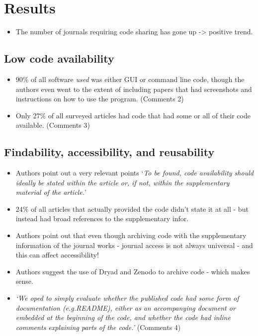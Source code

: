 \documentclass[
]{book}
\providecommand{\tightlist}{%
  \setlength{\itemsep}{0pt}\setlength{\parskip}{0pt}}
\begin{document}
\hypertarget{results-10}{%
\section{Results}\label{results-10}}

\begin{itemize}
\tightlist
\item
  The number of journals requiring code sharing has gone up -\textgreater{} positive trend.
\end{itemize}

\hypertarget{low-code-availability}{%
\subsection{Low code availability}\label{low-code-availability}}

\begin{itemize}
\tightlist
\item
  90\% of all software \emph{used} was either GUI or command line code, though the authors even went to the extent of including papers that had screenshots and instructions on how to use the program. (\protect\hypertarget{comments_culina}{}{Comments 2})
\item
  Only 27\% of all surveyed articles had code that had some or all of their code available. (\protect\hypertarget{comments_culina}{}{Comments 3})
\end{itemize}

\hypertarget{findability-accessibility-and-reusability}{%
\subsection{Findability, accessibility, and reusability}\label{findability-accessibility-and-reusability}}

\begin{itemize}
\tightlist
\item
  Authors point out a very relevant points `\emph{To be found, code availability should ideally be stated within the article or, if not, within the supplementary material of the article.}'
\item
  24\% of all articles that actually provided the code didn't state it at all - but instead had broad references to the supplementary infor.
\item
  Authors point out that even though archiving code with the supplementary information of the journal works - journal access is not always universal - and this can affect accessibility!
\item
  Authors suggest the use of Dryad and Zenodo to archive code - which makes sense.
\item
  \emph{`We oped to simply evaluate whether the published code had some form of documentation (e.g.README), either as an accompanying document or embedded at the beginning of the code, and whether the code had inline comments explaining parts of the code.'} (\protect\hypertarget{comments_culina}{}{Comments} 4)
\end{itemize}
\end{document}
